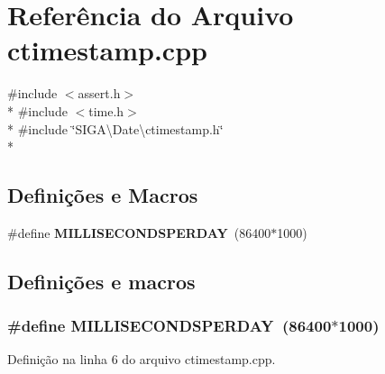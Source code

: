 \section{Referência do Arquivo ctimestamp.\+cpp}
\label{ctimestamp_8cpp}
{\ttfamily \#include $<$assert.\+h$>$}\\*
{\ttfamily \#include $<$time.\+h$>$}\\*
{\ttfamily \#include \char`\"{}S\+I\+G\+A\textbackslash{}\+Date\textbackslash{}ctimestamp.\+h\char`\"{}}\\*
\subsection*{Definições e Macros}
\begin{DoxyCompactItemize}
\item 
\#define {\bf M\+I\+L\+L\+I\+S\+E\+C\+O\+N\+D\+S\+P\+E\+R\+D\+AY}~(86400$\ast$1000)
\end{DoxyCompactItemize}


\subsection{Definições e macros}
\subsubsection[{M\+I\+L\+L\+I\+S\+E\+C\+O\+N\+D\+S\+P\+E\+R\+D\+AY}]{\setlength{\rightskip}{0pt plus 5cm}\#define M\+I\+L\+L\+I\+S\+E\+C\+O\+N\+D\+S\+P\+E\+R\+D\+AY~(86400$\ast$1000)}\label{ctimestamp_8cpp_a5a1d5d6ba4b58977a32c99b668b3d97d}


Definição na linha 6 do arquivo ctimestamp.\+cpp.

